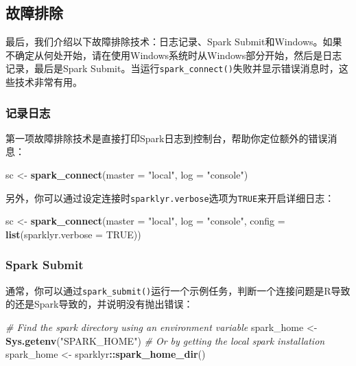 \documentclass[
]{article}
\newenvironment{Shaded}{\begin{snugshade}}{\end{snugshade}}
\newcommand{\CommentTok}[1]{\textcolor[rgb]{0.56,0.35,0.01}{\textit{#1}}}
\newcommand{\DataTypeTok}[1]{\textcolor[rgb]{0.13,0.29,0.53}{#1}}
\newcommand{\KeywordTok}[1]{\textcolor[rgb]{0.13,0.29,0.53}{\textbf{#1}}}
\newcommand{\NormalTok}[1]{#1}
\newcommand{\OperatorTok}[1]{\textcolor[rgb]{0.81,0.36,0.00}{\textbf{#1}}}
\newcommand{\OtherTok}[1]{\textcolor[rgb]{0.56,0.35,0.01}{#1}}
\newcommand{\StringTok}[1]{\textcolor[rgb]{0.31,0.60,0.02}{#1}}
\begin{document}
\hypertarget{ux6545ux969cux6392ux9664}{%
\subsection{故障排除}\label{ux6545ux969cux6392ux9664}}

最后，我们介绍以下故障排除技术：日志记录、Spark
Submit和Windows。如果不确定从何处开始，请在使用Windows系统时从Windows部分开始，然后是日志记录，最后是Spark
Submit。当运行\texttt{spark\_connect()}失败并显示错误消息时，这些技术非常有用。

\hypertarget{ux8bb0ux5f55ux65e5ux5fd7}{%
\subsubsection{记录日志}\label{ux8bb0ux5f55ux65e5ux5fd7}}

第一项故障排除技术是直接打印Spark日志到控制台，帮助你定位额外的错误消息：

\begin{Shaded}
\begin{Highlighting}[]
\NormalTok{sc <-}\StringTok{ }\KeywordTok{spark_connect}\NormalTok{(}\DataTypeTok{master =} \StringTok{"local"}\NormalTok{, }\DataTypeTok{log =} \StringTok{"console"}\NormalTok{)}
\end{Highlighting}
\end{Shaded}

另外，你可以通过设定连接时\texttt{sparklyr.verbose}选项为\texttt{TRUE}来开启详细日志：

\begin{Shaded}
\begin{Highlighting}[]
\NormalTok{sc <-}\StringTok{ }\KeywordTok{spark_connect}\NormalTok{(}\DataTypeTok{master =} \StringTok{"local"}\NormalTok{, }\DataTypeTok{log =} \StringTok{"console"}\NormalTok{, }\DataTypeTok{config =} \KeywordTok{list}\NormalTok{(}\DataTypeTok{sparklyr.verbose =} \OtherTok{TRUE}\NormalTok{))}
\end{Highlighting}
\end{Shaded}

\hypertarget{spark-submit}{%
\subsubsection{Spark Submit}\label{spark-submit}}

通常，你可以通过\texttt{spark\_submit()}运行一个示例任务，判断一个连接问题是R导致的还是Spark导致的，并说明没有抛出错误：

\begin{Shaded}
\begin{Highlighting}[]
\CommentTok{# Find the spark directory using an environment variable}
\NormalTok{spark_home <-}\StringTok{ }\KeywordTok{Sys.getenv}\NormalTok{(}\StringTok{"SPARK_HOME"}\NormalTok{)}
\CommentTok{# Or by getting the local spark installation}
\NormalTok{spark_home <-}\StringTok{ }\NormalTok{sparklyr}\OperatorTok{::}\KeywordTok{spark_home_dir}\NormalTok{()}
\end{Highlighting}
\end{Shaded}
\end{document}
